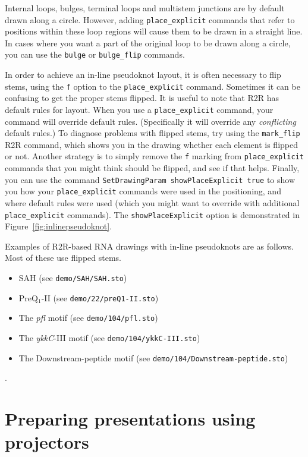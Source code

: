 \documentclass[letterpaper,12pt]{report}
\begin{document}
Internal loops, bulges, terminal loops and multistem junctions are by default drawn along a circle.  However, adding {\tt place\_explicit} commands that refer to positions within these loop regions will cause them to be drawn in a straight line.  In cases where you want a part of the original loop to be drawn along a circle, you can use the {\tt bulge} or {\tt bulge\_flip} commands.

In order to achieve an in-line pseudoknot layout, it is often necessary to flip stems, using the {\tt f} option to the {\tt place\_explicit} command.
Sometimes it can be confusing to get the proper stems flipped.
It is useful to note that R2R has default rules for layout.
When you use a {\tt place\_explicit} command, your command will override default rules.  (Specifically it will override any {\em conflicting} default rules.)
To diagnose problems with flipped stems, try using the {\tt mark\_flip} R2R command, which shows you in the drawing whether each element is flipped or not.  Another strategy is to simply remove the {\tt f} marking from {\tt place\_explicit} commands that you might think should be flipped, and see if that helps. 
Finally, you can use the command {\tt SetDrawingParam showPlaceExplicit true} to show you how your {\tt place\_explicit} commands were used in the positioning, and where default rules were used (which you might want to override with additional {\tt place\_explicit} commands).  The {\tt showPlaceExplicit} option is demonstrated in Figure~\ref{fig:inlinepseudoknot}.

Examples of R2R-based RNA drawings with in-line pseudoknots are as follows.  Most of these use flipped stems.
\begin{itemize}
\item SAH \cite{SAH,Weinberg22Motifs} (see {\tt demo/SAH/SAH.sto})
\item PreQ$_1$-II \cite{Weinberg22Motifs} (see {\tt demo/22/preQ1-II.sto})
\item The {\it pfl} motif \cite{Weinberg104Motifs} (see {\tt demo/104/pfl.sto})
\item The {\it ykkC}-III motif \cite{Weinberg104Motifs} (see {\tt demo/104/ykkC-III.sto}) 
\item The Downstream-peptide motif \cite{Weinberg104Motifs} (see {\tt demo/104/Downstream-peptide.sto})
\end{itemize}.

\section{Preparing presentations using projectors}
\end{document}
